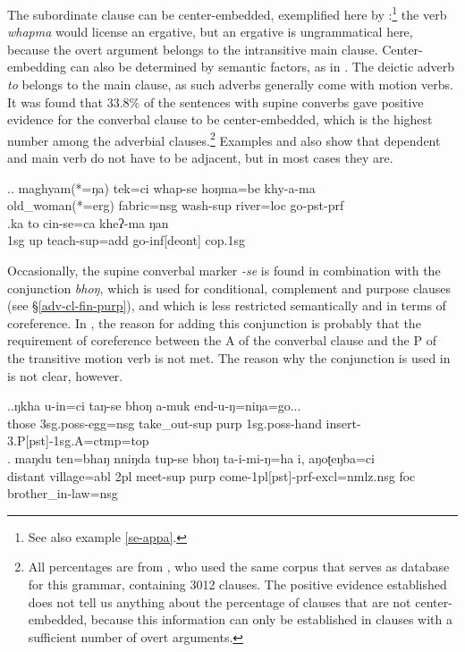 The subordinate clause can be center-embedded, exemplified here by \Next[a]:\footnote{See also example \ref{se-appa}.} the verb \emph{whapma} would license an ergative, but an ergative is ungrammatical here, because the overt argument belongs to the intransitive main clause. Center-embedding can also be determined by semantic factors, as in \Next[b]. The deictic adverb \emph{to} belongs to the main clause, as such adverbs generally come with motion verbs. It was found that 33.8\% of the sentences with supine converbs gave positive evidence for the converbal clause to be center-embedded, which is the highest number among the adverbial clauses.\footnote{All percentages are from \citep{Bierkandtetal_Scope}, who used the same corpus that serves as database for this grammar, containing 3012 clauses. The positive evidence established does not tell us anything about the percentage of clauses that are not center-embedded, because this information can only be established in clauses with a sufficient number of overt arguments.} Examples  \Last and  \Next also show that dependent and main verb do not have to be adjacent, but in most cases they are.
 		
\ex.\ag. maghyam(*=ŋa)   tek=ci        whap-se                hoŋma=be    khy-a-ma\\
old\_woman(*=erg) fabric{\sc =nsg} wash{\sc -sup} river{\sc =loc} go{\sc [3sg]-pst-prf}\\
\bg.ka  to  cin-se=ca    kheʔ-ma   ŋan\\
{\sc 1sg} up teach{\sc -sup=add} go{\sc -inf[deont]} {\sc cop.1sg}\\
		
Occasionally, the supine converbal marker \emph{-se} is found in combination with the conjunction \emph{bhoŋ}, which is used for conditional, complement and purpose clauses (see §\ref{adv-cl-fin-purp}), and which is less restricted semantically and in terms of coreference. In \Next[a], the reason for adding this conjunction is probably that the requirement of coreference between the A of the converbal clause and the P of the transitive motion verb is not met. The reason why the conjunction is used in \Next[b] is not clear, however.  

\ex.\ag.ŋkha u-in=ci    taŋ-se    bhoŋ a-muk           end-u-ŋ=niŋa=go...\\
those {\sc 3sg.poss-}egg{\sc =nsg} take\_out{\sc -sup} {\sc purp} {\sc 1sg.poss-}hand   insert{\sc -3.P[pst]-1sg.A=ctmp=top}\\ 
\bg. maŋdu ten=bhaŋ nniŋda tup-se bhoŋ ta-i-mi-ŋ=ha i, aŋoʈeŋba=ci\\
distant village{\sc =abl} {\sc 2pl} meet{\sc -sup} {\sc purp} come{\sc -1pl[pst]-prf-excl=nmlz.nsg} {\sc foc} brother\_in-law{\sc =nsg}\\
 


